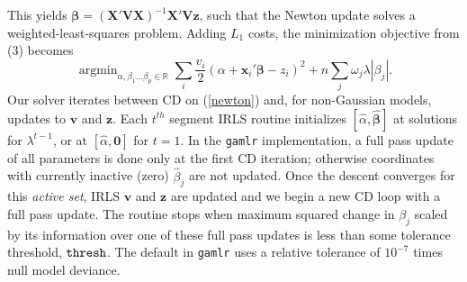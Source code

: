 \documentclass[12pt]{article}
\newcommand{\bs}[1]{\boldsymbol{#1}}
\newcommand{\mr}[1]{\mathrm{#1}}
\newcommand{\bm}[1]{\mathbf{#1}}
\newcommand{\ds}[1]{\mathds{#1}}
\DeclareMathOperator*{\argmin}{argmin}
\begin{document}
This yields $\bs{\beta} = (\bm{X}'\bm{V}\bm{X})^{-1}\bm{X}'\bm{V}\bm{z}$, such
that the Newton update solves a weighted-least-squares problem.   Adding $L_1$
costs,  the minimization objective from (3) becomes
\begin{equation} \label{newton}  \argmin_{\alpha,\beta_1 \ldots \beta_p \in
\ds{R}} \sum_i \frac{v_i}{2}(\alpha + \bm{x}_i'\bs{\beta} - z_i)^2  + n\sum_j \omega_j
\lambda |\beta_j|. \end{equation} Our solver iterates between CD on
(\ref{newton}) and,  for non-Gaussian models, updates to $\bm{v}$ and
$\bm{z}$. Each $t^{th}$ segment IRLS routine initializes $[\hat \alpha,
\bs{\hat \beta}]$ at solutions for $\lambda^{t-1}$, or at $[\hat \alpha,
\bm{0}]$ for $t=1$.  In the {\tt gamlr} implementation, a full pass update of
all parameters is done only at the first CD iteration; otherwise coordinates
with currently inactive (zero) $\hat\beta_j$ are not updated. Once the descent
converges for this {\it active set}, IRLS $\bm{v}$ and $\bm{z}$ are updated
and we begin a new CD loop with a full pass update.  The routine stops when
maximum squared change in $\beta_j$ scaled by its information over one of
these full pass updates is less than some tolerance threshold, ${\tt thresh}$.
The default in {\tt gamlr} uses a relative tolerance of $10^{-7}$ times null
model deviance.  

\vspace{.25cm}
\end{document}

